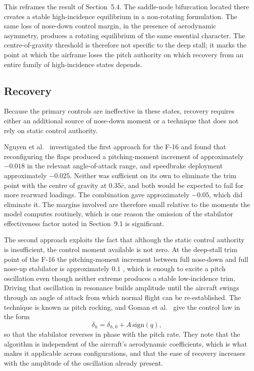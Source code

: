 \documentclass[
bindingoffset=5mm,  %
footnoteindent=3mm, %
hyphenation=true    %
]{src/wut-thesis}
\begin{document}
 This reframes the result of Section~5.4. The saddle-node bifurcation located
 there creates a stable high-incidence equilibrium in a non-rotating
 formulation. The same loss of nose-down control margin, in the presence of
 aerodynamic asymmetry, produces a rotating equilibrium of the same essential
 character. The centre-of-gravity threshold is therefore not specific to the
 deep stall; it marks the point at which the airframe loses the pitch authority
 on which recovery from an entire family of high-incidence states depends.
 
 \subsection{Recovery}
 
 Because the primary controls are ineffective in these states, recovery
 requires either an additional source of nose-down moment or a technique that
 does not rely on static control authority.
 
 Nguyen et al.~\cite{nguyen1979} investigated the first approach for the F-16
 and found that reconfiguring the flaps produced a pitching-moment increment of
 approximately $-0.018$ in the relevant angle-of-attack range, and speedbrake
 deployment approximately $-0.025$. Neither was sufficient on its own to
 eliminate the trim point with the centre of gravity at $0.35\bar{c}$, and both
 would be expected to fail for more rearward loadings. The combination gave
 approximately $-0.05$, which did eliminate it. The margins involved are
 therefore small relative to the moments the model computes routinely, which is
 one reason the omission of the stabilator effectiveness factor noted in
 Section~9.1 is significant.
 
 The second approach exploits the fact that although the static control
 authority is insufficient, the control moment available is not zero. At the
 deep-stall trim point of the F-16 the pitching-moment increment between full
 nose-down and full nose-up stabilator is approximately $0.1$
 \cite{nguyen1979}, which is enough to excite a pitch oscillation even though
 neither extreme produces a stable low-incidence trim. Driving that oscillation
 in resonance builds amplitude until the aircraft swings through an angle of
 attack from which normal flight can be re-established. The technique is known
 as pitch rocking, and Goman et al.~\cite{goman1993} give the control law in the
 form
 \begin{equation}
 	\delta_{h} = \delta_{h,0} + A\,\mathrm{sign}(q),
 	\label{eq:rocking}
 \end{equation}
 so that the stabilator reverses in phase with the pitch rate. They note that
 the algorithm is independent of the aircraft's aerodynamic coefficients, which
 is what makes it applicable across configurations, and that the ease of
 recovery increases with the amplitude of the oscillation already present.
 
\end{document}
